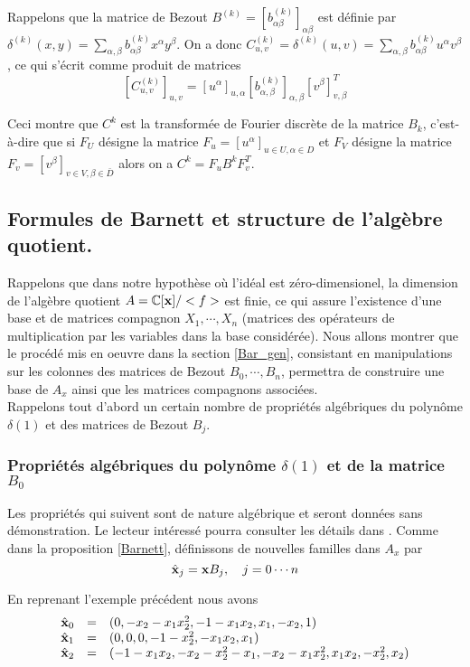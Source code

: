 \documentclass{standalone}
\begin{document}
Rappelons que la matrice de Bezout $B^{(k)} = \left[b^{(k)}_{\alpha\beta}\right]_{\alpha\beta}$ est définie par $\delta^{(k)}(x, y) = \sum_{\alpha,\beta} b^{(k)}_{\alpha\beta} x^\alpha y^\beta$. On a donc $C^{(k)}_{u,v} = \delta^{(k)}(u, v) = \sum_{\alpha,\beta} b^{(k)}_{\alpha\beta} u^\alpha v^\beta$, ce qui s'écrit comme produit de matrices
$$ \left[C^{(k)}_{u,v}\right]_{u,v} = \left[u^\alpha\right]_{u,\alpha} \left[b^{(k)}_{\alpha,\beta}\right]_{\alpha, \beta} \left[v^\beta\right]_{v, \beta}^T $$

Ceci montre que $C^k$ est la transformée de Fourier discrète de la matrice $B_k$, c'est-à-dire que si $F_U$ désigne la matrice $F_u = \left[ u^\alpha \right]_{u\in U, \alpha \in D}$
et $F_V$ désigne la matrice $F_v = \left[ v^\beta \right]_{v\in V, \beta \in \bar{D}}$ alors on a $C^k = F_uB^kF_v^T$.

\subsection{Formules de Barnett et structure de l'algèbre quotient.}
Rappelons que dans notre hypothèse où l'idéal est zéro-dimensionel, la dimension de l'algèbre quotient $A = \mathbb{C}[\bold{x}]/<f>$ est finie, ce qui assure l'existence d'une base et de matrices compagnon $X_1,\cdots, X_n$ (matrices des opérateurs de multiplication par les variables dans la base considérée). Nous allons montrer que le procédé mis en oeuvre dans la section \ref{Bar_gen}, consistant en manipulations sur les colonnes des matrices de Bezout $B_0, \cdots, B_n $, permettra de construire une base de $A_x$ ainsi que les matrices compagnons associées.\\
Rappelons tout d'abord un certain nombre de propriétés algébriques du polynôme $\delta(1)$ et des matrices de Bezout $B_j$.

\subsubsection{Propriétés algébriques du polynôme $\delta(1)$ et de la matrice $B_0$}
Les propriétés qui suivent sont de nature algébrique et seront données sans démonstration. Le lecteur intéressé pourra consulter les détails dans \cite{jpc, CM}. Comme dans la proposition \ref{Barnett}, définissons de nouvelles familles dans $A_x$ par
\begin{equation}
		\hat{\bold{x}}_j  =  \bold{x}B_j, \quad j=0\cdots n
\end{equation}

\begin{exmp}
En reprenant l'exemple précédent nous avons
\begin{equation}
	\begin{array}{lll}
		\hat{\bold{x}}_0 & = & (0, -x_2 - x_1x_2^2, -1 - x_1x_2, x_1, -x_2, 1) \\
		\hat{\bold{x}}_1 & = & (0, 0, 0, -1 - x_2^2, -x_1x_2, x_1) \\
		\hat{\bold{x}}_2 & = & (-1 - x_1x_2, -x_2 - x_2^2 - x_1, - x_2 - x_1x_2^2, x_1x_2, -x_2^2, x_2)
	\end{array}
\end{equation}
\end{exmp}
\end{document}
